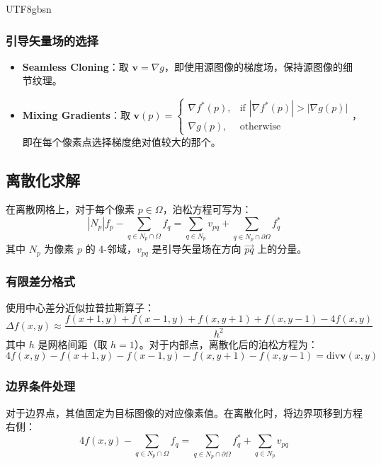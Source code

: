 \documentclass[11pt,a4paper]{article}
\begin{document}
\begin{CJK*}{UTF8}{gbsn}
\subsubsection{引导矢量场的选择}
\begin{itemize}
    \item \textbf{Seamless Cloning}：取 $\mathbf{v} = \nabla g$，即使用源图像的梯度场，保持源图像的细节纹理。
    \item \textbf{Mixing Gradients}：取 $\mathbf{v}(p) = \begin{cases} \nabla f^*(p), & \text{if } |\nabla f^*(p)| > |\nabla g(p)| \\ \nabla g(p), & \text{otherwise} \end{cases}$，即在每个像素点选择梯度绝对值较大的那个。
\end{itemize}

\subsection{离散化求解}
在离散网格上，对于每个像素 $p \in \Omega$，泊松方程可写为：
\begin{equation}
    |N_p| f_p - \sum_{q \in N_p \cap \Omega} f_q = \sum_{q \in N_p} v_{pq} + \sum_{q \in N_p \cap \partial\Omega} f^*_q
\end{equation}
其中 $N_p$ 为像素 $p$ 的 4-邻域，$v_{pq}$ 是引导矢量场在方向 $\overrightarrow{pq}$ 上的分量。

\subsubsection{有限差分格式}
使用中心差分近似拉普拉斯算子：
\begin{equation}
    \Delta f(x,y) \approx \frac{f(x+1,y) + f(x-1,y) + f(x,y+1) + f(x,y-1) - 4f(x,y)}{h^2}
\end{equation}
其中 $h$ 是网格间距（取 $h=1$）。对于内部点，离散化后的泊松方程为：
\begin{equation}
    4f(x,y) - f(x+1,y) - f(x-1,y) - f(x,y+1) - f(x,y-1) = \text{div} \mathbf{v}(x,y)
\end{equation}

\subsubsection{边界条件处理}
对于边界点，其值固定为目标图像的对应像素值。在离散化时，将边界项移到方程右侧：
\begin{equation}
    4f(x,y) - \sum_{q \in N_p \cap \Omega} f_q = \sum_{q \in N_p \cap \partial\Omega} f^*_q + \sum_{q \in N_p} v_{pq}
\end{equation}


\end{CJK*}
\end{document}
